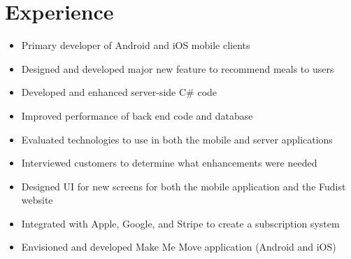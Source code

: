 \documentclass[12pt,letterpaper,sans]{moderncv}
\begin{document}
\section{Experience}
    \begin{itemize}[leftmargin=1.24in]
    	\item Primary developer of Android and iOS mobile clients
		\item Designed and developed major new feature to recommend meals to users
		\item Developed and enhanced server-side C\# code
    	\item Improved performance of back end code and database
    	\item Evaluated technologies to use in both the mobile and server applications
    	\item Interviewed customers to determine what enhancements were needed
    	\item Designed UI for new screens for both the mobile application and the Fudist website
    	\item Integrated with Apple, Google, and Stripe to create a subscription system	
    	\item Envisioned and developed Make Me Move application (Android and iOS)
    \end{itemize}
\newpage
{}   
\end{document}
